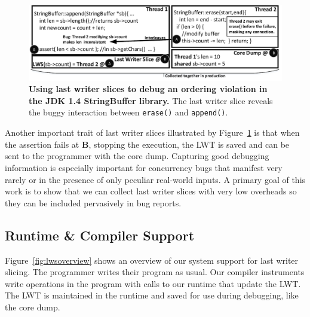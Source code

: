 \documentclass[preprint,10pt]{sigplanconf}
\newcommand{\lwt}{LWT\xspace}
\begin{document}


\begin{figure}[h]
\centering
\includegraphics[width=\columnwidth]{figs/JDKStringBufferDebug2.pdf}
\caption{\label{fig:jdklws}{\bf Using last writer slices to debug an
ordering violation in the JDK 1.4 StringBuffer library.} The last writer slice reveals the buggy interaction between {\tt erase()} and {\tt append()}.}
\end{figure}


Another important trait of last writer slices illustrated by
Figure~\ref{fig:jdklws} is that when the assertion fails at {\bf B}, stopping
the execution, the \lwt is saved and can be sent to the programmer with the
core dump.  Capturing good debugging information is especially important for
concurrency bugs that manifest very rarely or in the presence of only peculiar
real-world inputs.  A primary goal of this work is to show that we can collect
last writer slices with very low overheads so they can be included pervasively
in bug reports.


\subsection{Runtime \& Compiler Support}

Figure~\ref{fig:lwsoverview} shows an overview of our system support for last
writer slicing.  The programmer writes their program as usual. Our compiler
instruments write operations in the program with calls to our runtime that
update the \lwt.  The \lwt is maintained in the runtime and saved for use
during debugging, like the core dump. 
\end{document}

